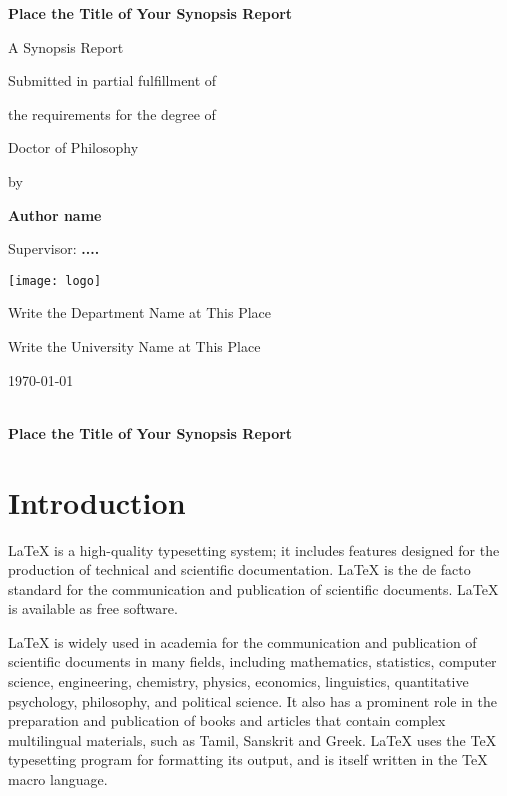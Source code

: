 \documentclass[11pt, a4paper]{article}
\newcommand{\Title}[1]{{\LARGE \centering \hrulefill\\ \textbf{#1}\\ \hrulefill}}
\begin{document}
\begin{titlepage}	
	\centering 	
	{\LARGE \bfseries Place the Title of Your Synopsis Report}
	\vspace{3.5\baselineskip}
	
	{\Large A Synopsis Report}
	\vspace{3\baselineskip}
	
	{\Large Submitted in partial fulfillment of}
	\vspace{0.5\baselineskip}
	
	{\Large  the requirements for the degree of }
	\vspace{3.5\baselineskip}
	
	{\Large Doctor of Philosophy}
	\vspace{0.5\baselineskip}
	
	{\Large by}
	\vspace{0.5\baselineskip}
	
	{\Large \bfseries Author name}
	\vspace{3\baselineskip}
	
	{\Large Supervisor: \bfseries ....}
	\vspace{3\baselineskip}
	
	\texttt{[image: logo]}
	\vspace{3\baselineskip}
	
	{\Large Write the Department Name at This Place}
	\vspace{0.5\baselineskip}
	
	{\Large Write the University Name at This Place}
	\vspace{3\baselineskip}
	
	{\Large \today}    	
\end{titlepage}		

\onehalfspacing
\setcounter{page}{1}
\Title{Place the Title of Your Synopsis Report}

\section{Introduction}\label{sec:intro}
LaTeX is a high-quality typesetting system; it includes features designed for the production of technical and scientific documentation. LaTeX is the de facto standard for the communication and publication of scientific documents. LaTeX is available as free software.

LaTeX is widely used in academia for the communication and publication of scientific documents in many fields, including mathematics, statistics, computer science, engineering, chemistry, physics, economics, linguistics, quantitative psychology, philosophy, and political science. It also has a prominent role in the preparation and publication of books and articles that contain complex multilingual materials, such as Tamil, Sanskrit and Greek. LaTeX uses the TeX typesetting program for formatting its output, and is itself written in the TeX macro language.
\end{document}
